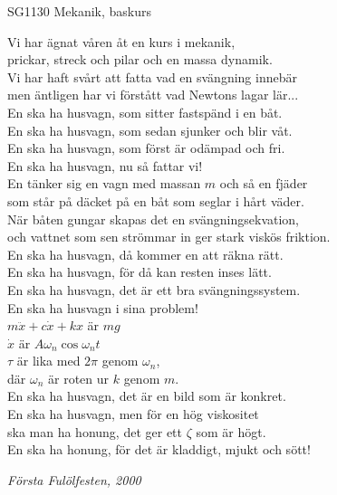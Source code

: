 \documentclass[a6paper,10pt]{article}
\begin{document}
\setlength{\oddsidemargin}{-0.37in}
\noindent
\begin{center}
\footnotesize SG1130 Mekanik, baskurs\\
\end{center}
Vi har ägnat våren åt en kurs i mekanik, \\
prickar, streck och pilar och en massa dynamik. \\
Vi har haft svårt att fatta vad en svängning innebär\\ 
men äntligen har vi förstått vad Newtons lagar lär...
\vspace{5pt} \\
En ska ha husvagn, som sitter fastspänd i en båt. \\
En ska ha husvagn, som sedan sjunker och blir våt. \\
En ska ha husvagn, som först är odämpad och fri. \\
En ska ha husvagn, nu så fattar vi! 
\vspace{5pt} \\
En tänker sig en vagn med massan $m$ och så en fjäder \\
som står på däcket på en båt som seglar i hårt väder. \\
När båten gungar skapas det en svängningsekvation, \\
och vattnet som sen strömmar in ger stark viskös friktion. 
\vspace{5pt} \\
En ska ha husvagn, då kommer en att räkna rätt. \\
En ska ha husvagn, för då kan resten inses lätt. \\
En ska ha husvagn, det är ett bra svängningssystem. \\
En ska ha husvagn i sina problem! 
\vspace{5pt} \\
$m \ddot{x} + c \dot{x} + k x$ är $m g$ \\
$\dot{x}$ är $A \omega_n \cos \omega_n t$ \\
$\tau$ är lika med $2\pi$ genom $\omega_n$, \\
där $\omega_n$ är roten ur $k$ genom $m$.
\vspace{5pt} \\
En ska ha husvagn, det är en bild som är konkret. \\
En ska ha husvagn, men för en hög viskositet \\
ska man ha honung, det ger ett $\zeta$ som är högt. \\
En ska ha honung, för det är kladdigt, mjukt och sött! 
\begin{flushright}
\textit{Första Fulölfesten, 2000}
\end{flushright}
\end{document}
